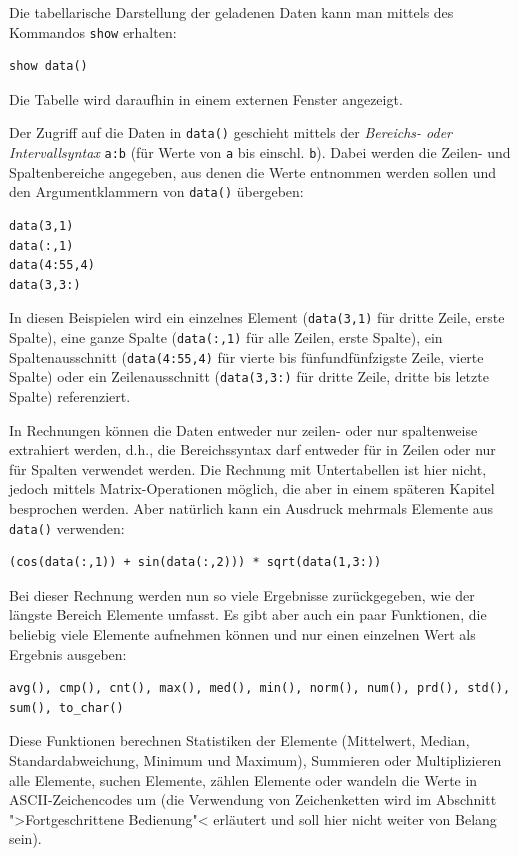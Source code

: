 \documentclass[DIV=14,headsepline,footsepline]{scrbook}
\begin{document}
				Die tabellarische Darstellung der geladenen Daten kann man mittels des Kommandos \lstinline+show+ erhalten:
				\begin{lstlisting}
show data()
				\end{lstlisting}
				Die Tabelle wird daraufhin in einem externen Fenster angezeigt.
				
				Der Zugriff auf die Daten in \lstinline+data()+ geschieht mittels der \emph{Bereichs- oder Intervallsyntax} \lstinline+a:b+ (für Werte von \lstinline+a+ bis einschl. \lstinline+b+). Dabei werden die Zeilen- und Spaltenbereiche angegeben, aus denen die Werte entnommen werden sollen und den Argumentklammern von \lstinline+data()+ übergeben:
				\begin{lstlisting}
data(3,1)
data(:,1)
data(4:55,4)
data(3,3:)
				\end{lstlisting}
				In diesen Beispielen wird ein einzelnes Element (\lstinline+data(3,1)+ für dritte Zeile, erste Spalte), eine ganze Spalte (\lstinline+data(:,1)+ für alle Zeilen, erste Spalte), ein Spaltenausschnitt (\lstinline+data(4:55,4)+ für vierte bis fünfundfünfzigste Zeile, vierte Spalte) oder ein Zeilenausschnitt (\lstinline+data(3,3:)+ für dritte Zeile, dritte bis letzte Spalte) referenziert.
				
				In Rechnungen können die Daten entweder nur zeilen- oder nur spaltenweise extrahiert werden, d.h., die Bereichssyntax darf entweder für in Zeilen oder nur für Spalten verwendet werden. Die Rechnung mit Untertabellen ist hier nicht, jedoch mittels Matrix-Operationen möglich, die aber in einem späteren Kapitel besprochen werden. Aber natürlich kann ein Ausdruck mehrmals Elemente aus \lstinline+data()+ verwenden:
				\begin{lstlisting}
(cos(data(:,1)) + sin(data(:,2))) * sqrt(data(1,3:))
				\end{lstlisting}
				Bei dieser Rechnung werden nun so viele Ergebnisse zurückgegeben, wie der längste Bereich Elemente umfasst. Es gibt aber auch ein paar Funktionen, die beliebig viele Elemente aufnehmen können und nur einen einzelnen Wert als Ergebnis ausgeben:
				\begin{lstlisting}
avg(), cmp(), cnt(), max(), med(), min(), norm(), num(), prd(), std(), sum(), to_char()
				\end{lstlisting}
				Diese Funktionen berechnen Statistiken der Elemente (Mittelwert, Median, Standardabweichung, Minimum und Maximum), Summieren oder Multiplizieren alle Elemente, suchen Elemente, zählen Elemente oder wandeln die Werte in ASCII-Zeichencodes um (die Verwendung von Zeichenketten wird im Abschnitt ">Fortgeschrittene Bedienung"< erläutert und soll hier nicht weiter von Belang sein).
				
\end{document}
